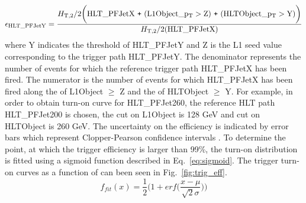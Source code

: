 \begin{equation}
 \label{eq:eff}
 {\rm \epsilon_{HLT\_PFJetY}} = \frac{\httwo {\rm \bigg(HLT\_PFJetX~\plus (L1Object\_\pt > Z)~\plus (HLTObject\_\pt > Y)\bigg)}}{\httwo {\rm (HLT\_PFJetX)}}
\end{equation}
where Y indicates the \pt threshold of HLT\_PFJetY and Z is the L1 seed value corresponding to the trigger path HLT\_PFJetY. The denominator represents the number of events for which the reference trigger path HLT\_PFJetX has been fired. The numerator is the number of events for which HLT\_PFJetX has been fired along the \pt of L1Object $\geq$ Z and the \pt of HLTObject $\geq$ Y. For example, in order to obtain turn-on curve for HLT\_PFJet260, the reference HLT path HLT\_PFJet200 is chosen, the \pt cut on L1Object is 128 GeV and \pt cut on HLTObject is 260 GeV. The uncertainty on the efficiency is indicated by error bars which represent Clopper-Pearson confidence intervals \cite{10.2307/2331986}. To determine the point, at which the trigger efficiency is larger than 99\%, the turn-on distribution is fitted using a sigmoid function described in Eq.~\ref{eq:sigmoid}. The trigger turn-on curves as a function of \httwo can been seen in Fig.~\ref{fig:trig_eff}.
\begin{equation}
 \label{eq:sigmoid}
  f_{fit} (x) = \frac {1}{2} \Bigg( 1 ~\texttt{+}~ erf \Big(\frac {x - \mu}{\sqrt{2} \sigma} \Big) \Bigg)
\end{equation}

